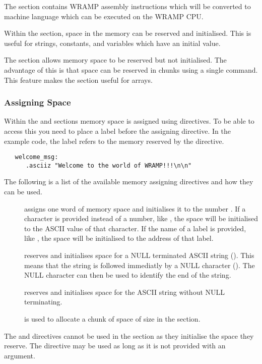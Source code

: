The \text section contains WRAMP assembly instructions which will be
converted to machine language which can be executed on the WRAMP CPU.

Within the \data section, space in the memory can be reserved and
initialised. This is useful for strings, constants, and variables
which have an initial value.

The \bss section allows memory space to be reserved but not initialised.
The advantage of this is that space can be reserved in chunks using a single
command. This feature makes the \bss section useful for arrays.

\subsubsection{Assigning Space}
Within the \data and \bss sections memory space is assigned using directives. 
To be able to access this you need to place a label before the assigning
directive. In the example code, the label  refers to the
memory reserved by the \asciiz directive.

\begin{verbatim}
   welcome_msg:
      .asciiz "Welcome to the world of WRAMP!!!\n\n"
\end{verbatim}

The following is a list of the available memory assigning directives
and how they can be used.

\begin{description}

\item[\word {}] assigns one word of memory space and initialises it to
the number .
If a character is provided instead of a number, like , the space
will be initialised to the ASCII value of that character.
If the name of a label is provided, like , the space will be
initialised to the address of that label.

\item[\asciiz {}] reserves and initialises space 
for a NULL terminated ASCII string ().
This means that the string is followed immediatly by a NULL
character (). The NULL character can then be used
to identify the end of the string.

\item[\ascii {}] reserves and initialises space for 
the ASCII string  without NULL terminating.

\item[\Space {}] is used to allocate a chunk of space 
of size  in the \bss section.

\end{description}
The \ascii and \asciiz directives cannot be used in the \bss section
as they initialise the space they reserve. The \word directive may be
used as long as it is not provided with an argument.

